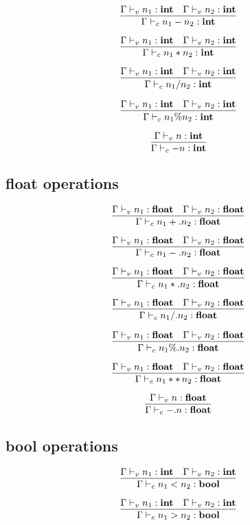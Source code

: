 \documentclass{article}
\begin{document}
\[\infer{\Gamma \vdash_c n_1-n_2:\mathbf{int}}{\Gamma \vdash_v n_1: \mathbf{int} \quad \Gamma \vdash_v n_2: \mathbf{int}}\]

\[\infer{\Gamma \vdash_c n_1*n_2:\mathbf{int}}{\Gamma \vdash_v n_1: \mathbf{int} \quad \Gamma \vdash_v n_2: \mathbf{int}}\]

\[\infer{\Gamma \vdash_c n_1/n_2:\mathbf{int}}{\Gamma \vdash_v n_1: \mathbf{int} \quad \Gamma \vdash_v n_2: \mathbf{int}}\]

\[\infer{\Gamma \vdash_c n_1 \% n_2:\mathbf{int}}{\Gamma \vdash_v n_1: \mathbf{int} \quad \Gamma \vdash_v n_2: \mathbf{int}}\]

\[\infer{\Gamma \vdash_c -n:\mathbf{int}}{\Gamma \vdash_v n: \mathbf{int}} \]

\subsection{float operations}

\[\infer{\Gamma \vdash_c n_1+.n_2:\mathbf{float}}{\Gamma \vdash_v n_1: \mathbf{float} \quad \Gamma \vdash_v n_2: \mathbf{float}}\]

\[\infer{\Gamma \vdash_c n_1-.n_2:\mathbf{float}}{\Gamma \vdash_v n_1: \mathbf{float} \quad \Gamma \vdash_v n_2: \mathbf{float}}\]

\[\infer{\Gamma \vdash_c n_1*.n_2:\mathbf{float}}{\Gamma \vdash_v n_1: \mathbf{float} \quad \Gamma \vdash_v n_2: \mathbf{float}}\]

\[\infer{\Gamma \vdash_c n_1/.n_2:\mathbf{float}}{\Gamma \vdash_v n_1: \mathbf{float} \quad \Gamma \vdash_v n_2: \mathbf{float}}\]

\[\infer{\Gamma \vdash_c n_1 \%. n_2:\mathbf{float}}{\Gamma \vdash_v n_1: \mathbf{float} \quad \Gamma \vdash_v n_2: \mathbf{float}}\]

\[\infer{\Gamma \vdash_c n_1 **\, n_2:\mathbf{float}}{\Gamma \vdash_v n_1: \mathbf{float} \quad \Gamma \vdash_v n_2: \mathbf{float}}\]

\[\infer{\Gamma \vdash_c -.n:\mathbf{float}}{\Gamma \vdash_v n: \mathbf{float}} \]

\subsection{bool operations}

\[\infer{\Gamma \vdash_c n_1 < n_2:\mathbf{bool}}{\Gamma \vdash_v n_1: \mathbf{int} \quad \Gamma \vdash_v n_2: \mathbf{int}}\]

\[\infer{\Gamma \vdash_c n_1 > n_2:\mathbf{bool}}{\Gamma \vdash_v n_1: \mathbf{int} \quad \Gamma \vdash_v n_2: \mathbf{int}}\]
\end{document}
